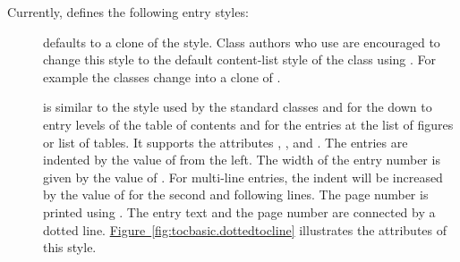 Currently,  defines the following entry styles:
\begin{description}
\item[] defaults to a clone of the 
  style. Class authors who use  are encouraged to change
  this style to the default content-list style of the class using
  . For example the \KOMAScript{} classes change
   into a clone of .
\item[] is similar to the style used by the standard
  classes  and  for the  down to
   entry levels of the table of contents and for the
  entries at the list of figures or list of tables. It supports the attributes
  , , and . The entries are
  indented by the value of  from the left. The width of the
  entry number is given by the value of . For multi-line
  entries, the indent will be increased by the value of  for
  the second and following lines. The page number is printed using
  . The entry text and the page number
  are connected by a dotted line. \hyperref[fig:tocbasic.dottedtocline]%
  {Figure~\ref*{fig:tocbasic.dottedtocline}} illustrates the attributes of
  this style.
  \begin{figure}
    \centering
\end{figure}
\end{description}
